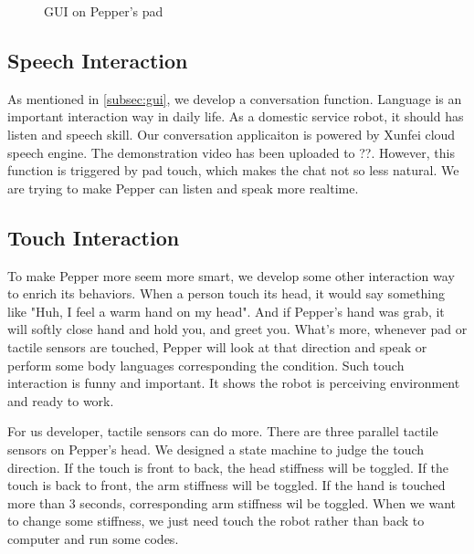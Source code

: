 \begin{figure}[!h]
    \caption{GUI on Pepper's pad}
    
    \label{figb} %
    
    \end{figure}

\subsection{Speech Interaction}
\label{subsec:speech}
As mentioned in \ref{subsec:gui}, we develop a conversation function. 
Language is an important interaction way in daily life.
As a domestic service robot, it should has listen and speech skill.
Our conversation applicaiton is powered by Xunfei cloud speech engine.
The demonstration video has been uploaded to ??.
However, this function is triggered by pad touch, which makes the chat not so less natural.
We are trying to make Pepper can listen and speak more realtime.

\subsection{Touch Interaction}
\label{subsec:otherinteraction}
To make Pepper more seem more smart, we develop some other interaction way to enrich its behaviors.
When a person touch its head, it would say something like "Huh, I feel a warm hand on my head".
And if Pepper's hand was grab, it will softly close hand and hold you, and greet you.
What's more, whenever pad or tactile sensors are touched, Pepper will look at that direction and speak or perform some body languages corresponding the condition.
Such touch interaction is funny and important.
It shows the robot is perceiving environment and ready to work.

For us developer, tactile sensors can do more.
There are three parallel tactile sensors on Pepper's head.
We designed a state machine to judge the touch direction.
If the touch is front to back, the head stiffness will be toggled.
If the touch is back to front, the arm stiffness will be toggled.
If the hand is touched more than 3 seconds, corresponding arm stiffness wil be toggled.
When we want to change some stiffness, we just need touch the robot rather than back to computer and run some codes.